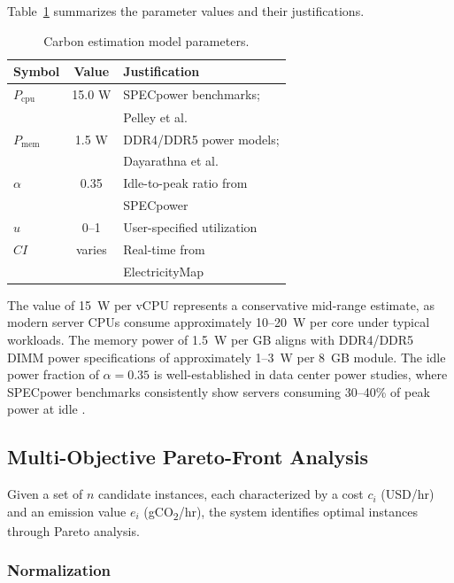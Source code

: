\documentclass[conference]{IEEEtran}
\begin{document}
Table~\ref{tab:params} summarizes the parameter values and their justifications.

\begin{table}[htbp]
\centering
\caption{Carbon estimation model parameters.}
\label{tab:params}
\small
\begin{tabular}{lcl}
\toprule
\textbf{Symbol} & \textbf{Value} & \textbf{Justification} \\
\midrule
$P_{\text{cpu}}$ & 15.0 W & SPECpower benchmarks; \\
                  &        & Pelley et al. \cite{b10} \\
$P_{\text{mem}}$ & 1.5 W  & DDR4/DDR5 power models; \\
                  &        & Dayarathna et al. \cite{b11} \\
$\alpha$          & 0.35   & Idle-to-peak ratio from \\
                  &        & SPECpower \cite{b12} \\
$u$               & 0--1   & User-specified utilization \\
$CI$              & varies & Real-time from \\
                  &        & ElectricityMap \cite{b9} \\
\bottomrule
\end{tabular}
\end{table}

The value of 15~W per vCPU represents a conservative mid-range estimate, as modern server CPUs consume approximately 10--20~W per core under typical workloads. The memory power of 1.5~W per GB aligns with DDR4/DDR5 DIMM power specifications of approximately 1--3~W per 8~GB module. The idle power fraction of $\alpha = 0.35$ is well-established in data center power studies, where SPECpower benchmarks consistently show servers consuming 30--40\% of peak power at idle \cite{b12}.

\subsection{Multi-Objective Pareto-Front Analysis}

Given a set of $n$ candidate instances, each characterized by a cost $c_i$ (USD/hr) and an emission value $e_i$ (gCO\textsubscript{2}/hr), the system identifies optimal instances through Pareto analysis.

\subsubsection{Normalization}
\end{document}
